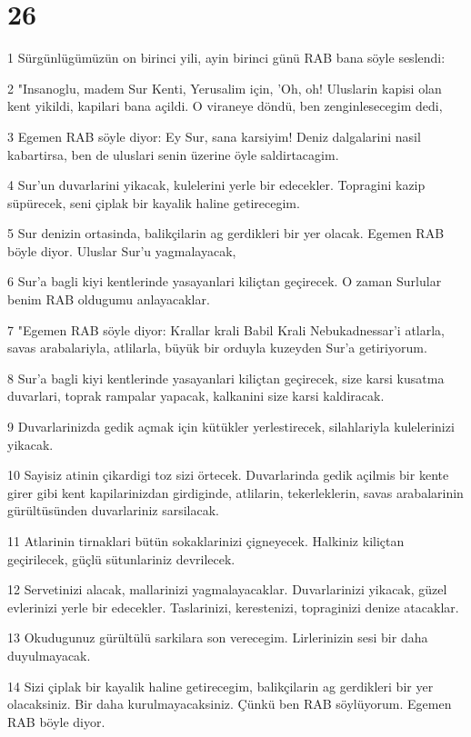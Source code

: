 \chapter{26}

\par 1 Sürgünlügümüzün on birinci yili, ayin birinci günü RAB bana söyle seslendi:
\par 2 "Insanoglu, madem Sur Kenti, Yerusalim için, 'Oh, oh! Uluslarin kapisi olan kent yikildi, kapilari bana açildi. O viraneye döndü, ben zenginlesecegim dedi,
\par 3 Egemen RAB söyle diyor: Ey Sur, sana karsiyim! Deniz dalgalarini nasil kabartirsa, ben de uluslari senin üzerine öyle saldirtacagim.
\par 4 Sur'un duvarlarini yikacak, kulelerini yerle bir edecekler. Topragini kazip süpürecek, seni çiplak bir kayalik haline getirecegim.
\par 5 Sur denizin ortasinda, balikçilarin ag gerdikleri bir yer olacak. Egemen RAB böyle diyor. Uluslar Sur'u yagmalayacak,
\par 6 Sur'a bagli kiyi kentlerinde yasayanlari kiliçtan geçirecek. O zaman Surlular benim RAB oldugumu anlayacaklar.
\par 7 "Egemen RAB söyle diyor: Krallar krali Babil Krali Nebukadnessar'i atlarla, savas arabalariyla, atlilarla, büyük bir orduyla kuzeyden Sur'a getiriyorum.
\par 8 Sur'a bagli kiyi kentlerinde yasayanlari kiliçtan geçirecek, size karsi kusatma duvarlari, toprak rampalar yapacak, kalkanini size karsi kaldiracak.
\par 9 Duvarlarinizda gedik açmak için kütükler yerlestirecek, silahlariyla kulelerinizi yikacak.
\par 10 Sayisiz atinin çikardigi toz sizi örtecek. Duvarlarinda gedik açilmis bir kente girer gibi kent kapilarinizdan girdiginde, atlilarin, tekerleklerin, savas arabalarinin gürültüsünden duvarlariniz sarsilacak.
\par 11 Atlarinin tirnaklari bütün sokaklarinizi çigneyecek. Halkiniz kiliçtan geçirilecek, güçlü sütunlariniz devrilecek.
\par 12 Servetinizi alacak, mallarinizi yagmalayacaklar. Duvarlarinizi yikacak, güzel evlerinizi yerle bir edecekler. Taslarinizi, kerestenizi, topraginizi denize atacaklar.
\par 13 Okudugunuz gürültülü sarkilara son verecegim. Lirlerinizin sesi bir daha duyulmayacak.
\par 14 Sizi çiplak bir kayalik haline getirecegim, balikçilarin ag gerdikleri bir yer olacaksiniz. Bir daha kurulmayacaksiniz. Çünkü ben RAB söylüyorum. Egemen RAB böyle diyor.

